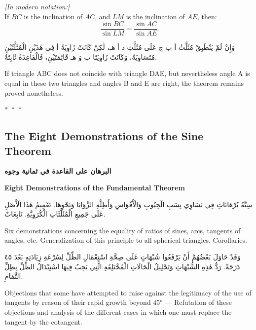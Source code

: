 \documentclass[11pt,a4paper]{article}
\theoremstyle{plain}
\theoremstyle{definition}
\theoremstyle{remark}
\newcommand{\ar}[1]{{\arabicfont\beginR #1\endR}}
\newcommand{\bilingualpair}[2]{%
  \par\noindent
  \begin{minipage}[t]{0.48\textwidth}
  #1
  \end{minipage}%
  \hfill
  \begin{minipage}[t]{0.48\textwidth}
  \vspace*{0pt}#2
  \end{minipage}\par\vspace{0.3cm}%
}
\newcommand{\ornament}{\begin{center}\textcolor{goldaccent}{$\ast$~$\ast$~$\ast$}\end{center}}
\begin{document}
\noindent\textit{[In modern notation:]}\\
If $BC$ is the inclination of $AC$, and $LM$ is the inclination of $AE$, then:
\[
\frac{\sin BC}{\sin LM} = \frac{\sin AC}{\sin AE}
\]

\vspace{0.3cm}

\bilingualpair{\ar{وَإِنْ لَمْ يَنْطَبِقْ مُثَلَّثُ أ ب ج عَلَى مُثَلَّثِ د أ هـ، لٰكِنْ كَانَتْ زَاوِيَةُ أ فِي هٰذَيْنِ الْمُثَلَّثَيْنِ مُتَسَاوِيَةً، وَكَانَتْ زَاوِيَتَا ب وَ هـ قَائِمَتَيْنِ، فَالْقَاعِدَةُ ثَابِتَةٌ.}}{If triangle ABC does not coincide with triangle DAE, but nevertheless angle A is equal in these two triangles and angles B and E are right, the theorem remains proved nonetheless.}

\ornament

\subsection{The Eight Demonstrations of the Sine Theorem}
\label{sec:sine-theorem}

\bilingualpair{\noindent\textcolor{arabicblue}{\textbf{\ar{البرهان على القاعدة في ثمانية وجوه}}}}{\noindent\textcolor{sectioncolor}{\textbf{Eight Demonstrations of the Fundamental Theorem}}}

\vspace{0.3cm}

\bilingualpair{\ar{سِتَّةُ بُرْهَانَاتٍ فِي تَسَاوِي نِسَبِ الْجِيُوبِ وَالْأَقْوَاسِ وَأَظِلَّةِ الزَّوَايَا وَنَحْوِهَا. تَعْمِيمُ هٰذَا الْأَصْلِ عَلَى جَمِيعِ الْمُثَلَّثَاتِ الْكُرَوِيَّةِ. تَابِعَاتٌ.}}{Six demonstrations concerning the equality of ratios of sines, arcs, tangents of angles, etc. Generalization of this principle to all spherical triangles. Corollaries.}

\vspace{0.3cm}

\bilingualpair{\ar{وَقَدْ حَاوَلَ بَعْضُهُمْ أَنْ يَرْفَعُوا شُبْهَاتٍ عَلَى صِحَّةِ اسْتِعْمَالِ الظِّلِّ لِسُرْعَةِ زِيَادَتِهِ بَعْدَ ٤٥ دَرَجَةً. رَدُّ هٰذِهِ الشُّبْهَاتِ وَتَحْلِيلُ الْحَالَاتِ الْمُخْتَلِفَةِ الَّتِي يَجِبُ فِيهَا اسْتِبْدَالُ الظِّلِّ بِظِلِّ التَّمَامِ.}}{Objections that some have attempted to raise against the legitimacy of the use of tangents by reason of their rapid growth beyond 45° --- Refutation of these objections and analysis of the different cases in which one must replace the tangent by the cotangent.}
\end{document}
